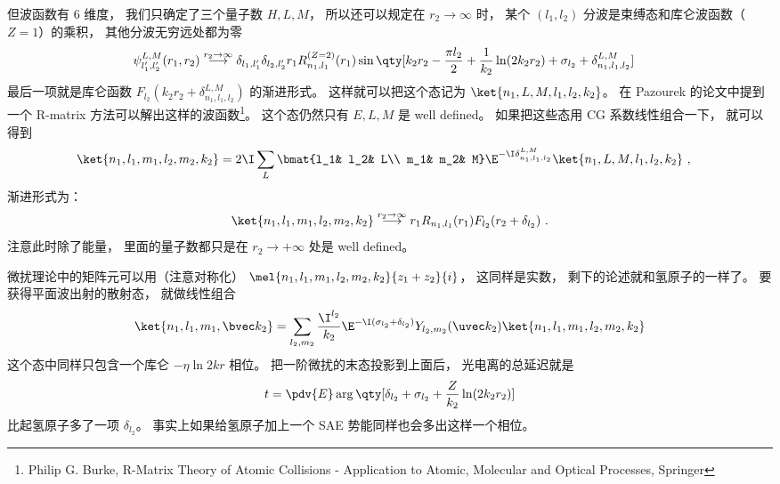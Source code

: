 但波函数有 6 维度， 我们只确定了三个量子数 $H,L,M$， 所以还可以规定在 $r_2\to\infty$ 时， 某个 $(l_1,l_2)$ 分波是束缚态和库仑波函数（$Z=1$）的乘积， 其他分波无穷远处都为零
\begin{equation}
\begin{aligned}
&\psi_{l'_1,l'_2}^{L, M}(r_1, r_2) \overset{r_2\to\infty}{\longrightarrow} \delta_{l_1,l'_1}\delta_{l_2,l'_2} r_1 R_{n_1,l_1}^{(Z=2)}(r_1)
\sin\qty[k_2 r_2 - \frac{\pi l_2}{2} +\frac{1}{k_2}\ln(2k_2 r_2) + \sigma_{l_2} + \delta_{n_1,l_1,l_2}^{L,M}]
\end{aligned}
\end{equation}
最后一项就是库仑函数 $F_{l_2}(k_2 r_2 + \delta_{n_1,l_1,l_2}^{L,M})$ 的渐进形式。 这样就可以把这个态记为 $\ket{n_1,L,M,l_1,l_2,k_2}$。 在 Pazourek 的论文中提到一个 R-matrix 方法可以解出这样的波函数\footnote{Philip G. Burke, R-Matrix Theory of Atomic Collisions - Application to Atomic, Molecular and Optical Processes, Springer}。 这个态仍然只有 $E,L,M$ 是 well defined。 如果把这些态用 CG 系数线性组合一下， 就可以得到
\begin{equation}
\begin{aligned}
&\ket{n_1,l_1,m_1,l_2,m_2,k_2}
= 2\I \sum_{L} \bmat{l_1& l_2& L\\ m_1& m_2& M} \E^{-\I \delta_{n_1,l_1,l_2}^{L,M}} \ket{n_1,L,M,l_1,l_2,k_2}~,
\end{aligned}
\end{equation}
渐进形式为：
\begin{equation}
\ket{n_1,l_1,m_1, l_2,m_2,k_2} \overset{r_2\to\infty}{\longrightarrow} r_1 R_{n_1,l_1}(r_1) F_{l_2}(r_2 + \delta_{l_2})~.
\end{equation}
注意此时除了能量， 里面的量子数都只是在 $r_2\to+\infty$ 处是 well defined。

微扰理论中的矩阵元可以用（注意对称化） $\mel{n_1,l_1,m_1, l_2,m_2,k_2}{z_1 + z_2}{i}$， 这同样是实数， 剩下的论述就和氢原子的一样了。 要获得平面波出射的散射态， 就做线性组合
\begin{equation}
\ket{n_1, l_1, m_1, \bvec k_2} = \sum_{l_2,m_2}\frac{\I^{l_2}}{k_2} \E^{-\I(\sigma_{l_2}+\delta_{l_2})} Y_{l_2,m_2} (\uvec k_2) \ket{n_1,l_1,m_1, l_2,m_2,k_2}
\end{equation}
这个态中同样只包含一个库仑 $-\eta\ln 2kr$ 相位。 把一阶微扰的末态投影到上面后， 光电离的总延迟就是
\begin{equation}
t = \pdv{E} \arg\qty[\delta_{l_2} + \sigma_{l_2} + \frac{Z}{k_2}\ln(2k_2 r_2)] %
\end{equation}
比起氢原子多了一项 $\delta_{l_2}$。 事实上如果给氢原子加上一个 SAE 势能同样也会多出这样一个相位。

